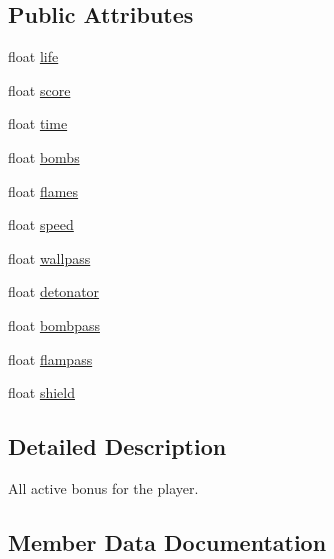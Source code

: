 \subsection*{Public Attributes}
\begin{DoxyCompactItemize}
\item 
float \hyperlink{struct_player_1_1_active_bonus_a692c7135db9ad842843290ee5dcbac89}{life}
\item 
float \hyperlink{struct_player_1_1_active_bonus_adfe7670def68cc0126c258b7a3f86d05}{score}
\item 
float \hyperlink{struct_player_1_1_active_bonus_a4d5933b2c052d233a8ee9934577f6fdd}{time}
\item 
float \hyperlink{struct_player_1_1_active_bonus_a64e48a895e5b25afe0ac4ae485ce4d72}{bombs}
\item 
float \hyperlink{struct_player_1_1_active_bonus_a1211f1a048e0c7ae2c19db42c8ddf66b}{flames}
\item 
float \hyperlink{struct_player_1_1_active_bonus_a317b13d54c4fb53345a60fb2f4f747ce}{speed}
\item 
float \hyperlink{struct_player_1_1_active_bonus_af5a24d36905852ddac53dfea2712e81d}{wallpass}
\item 
float \hyperlink{struct_player_1_1_active_bonus_a6aa16b9216e018365e36bedbc77c759b}{detonator}
\item 
float \hyperlink{struct_player_1_1_active_bonus_ad82ff4f3afc445717eaf75a07c899fb3}{bombpass}
\item 
float \hyperlink{struct_player_1_1_active_bonus_a5e2f4f07c50fc159c16270e9fc1d4d5c}{flampass}
\item 
float \hyperlink{struct_player_1_1_active_bonus_acb8273d2a958ca83d8799ce2bc3e9491}{shield}
\end{DoxyCompactItemize}


\subsection{Detailed Description}
All active bonus for the player. 

\subsection{Member Data Documentation}
\mbox{\label{struct_player_1_1_active_bonus_ad82ff4f3afc445717eaf75a07c899fb3}} 
